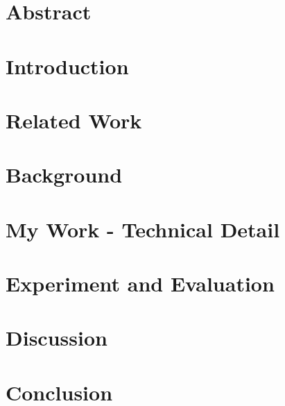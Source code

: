 \documentclass[a4paper,12pt]{article}
\begin{document}
	


\section*{Abstract}

\clearpage


\tableofcontents
\clearpage






\section{Introduction}


\clearpage

\section{Related Work}

\clearpage

\section{Background}



\clearpage

\section{My Work - Technical Detail}




\clearpage

\section{Experiment and Evaluation}





\clearpage

\section{Discussion}

\clearpage

\section{Conclusion}

\clearpage



\end{document}
